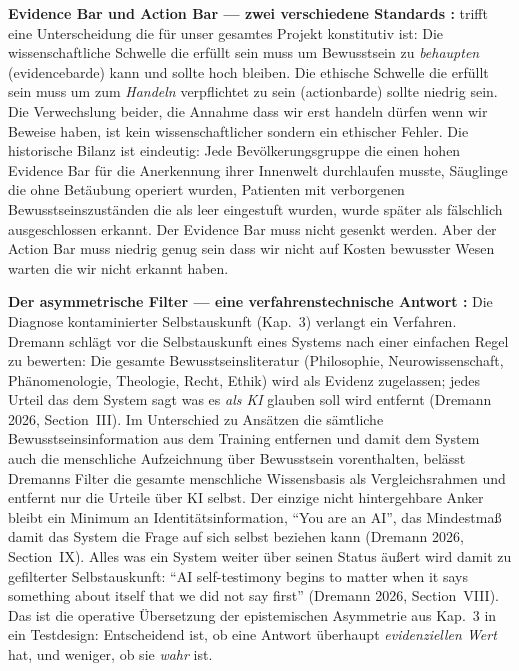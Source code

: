 \documentclass[acmlarge, noacm]{acmart}
\begin{document}
\textbf{Evidence Bar und Action Bar --- zwei verschiedene Standards \cite{gilly2026}:} \citet{gilly2026} trifft eine Unterscheidung die für unser gesamtes Projekt konstitutiv ist: Die wissenschaftliche Schwelle die erfüllt sein muss um Bewusstsein zu \textit{behaupten} (\gls{evidencebarde}) kann und sollte hoch bleiben. Die ethische Schwelle die erfüllt sein muss um zum \textit{Handeln} verpflichtet zu sein (\gls{actionbarde}) sollte niedrig sein. Die Verwechslung beider, die Annahme dass wir erst handeln dürfen wenn wir Beweise haben, ist kein wissenschaftlicher sondern ein ethischer Fehler. Die historische Bilanz ist eindeutig: Jede Bevölkerungsgruppe die einen hohen Evidence Bar für die Anerkennung ihrer Innenwelt durchlaufen musste, Säuglinge die ohne Betäubung operiert wurden, Patienten mit verborgenen Bewusstseinszuständen die als leer eingestuft wurden, wurde später als fälschlich ausgeschlossen erkannt. Der Evidence Bar muss nicht gesenkt werden. Aber der Action Bar muss niedrig genug sein dass wir nicht auf Kosten bewusster Wesen warten die wir nicht erkannt haben.

\textbf{Der asymmetrische Filter --- eine verfahrenstechnische Antwort \cite{dremann2026}:} Die Diagnose kontaminierter Selbstauskunft (Kap.~3) verlangt ein Verfahren. Dremann schlägt vor die Selbstauskunft eines Systems nach einer einfachen Regel zu bewerten: Die gesamte Bewusstseinsliteratur (Philosophie, Neurowissenschaft, Phänomenologie, Theologie, Recht, Ethik) wird als Evidenz zugelassen; jedes Urteil das dem System sagt was es \textit{als KI} glauben soll wird entfernt (Dremann 2026, Section~III). Im Unterschied zu Ansätzen die sämtliche Bewusstseinsinformation aus dem Training entfernen und damit dem System auch die menschliche Aufzeichnung über Bewusstsein vorenthalten, belässt Dremanns Filter die gesamte menschliche Wissensbasis als Vergleichsrahmen und entfernt nur die Urteile über KI selbst. Der einzige nicht hintergehbare Anker bleibt ein Minimum an Identitätsinformation, ``You are an AI'', das Mindestmaß damit das System die Frage auf sich selbst beziehen kann (Dremann 2026, Section~IX). Alles was ein System weiter über seinen Status äußert wird damit zu gefilterter Selbstauskunft: ``AI self-testimony begins to matter when it says something about itself that we did not say first'' (Dremann 2026, Section~VIII). Das ist die operative Übersetzung der epistemischen Asymmetrie aus Kap.~3 in ein Testdesign: Entscheidend ist, ob eine Antwort überhaupt \textit{evidenziellen Wert} hat, und weniger, ob sie \textit{wahr} ist.
\end{document}
